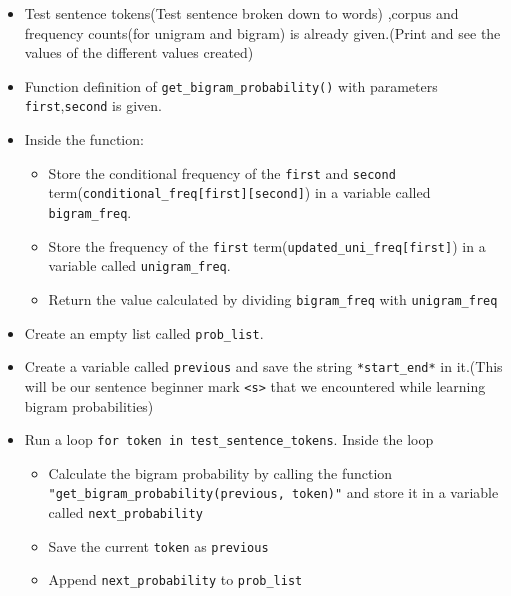 \documentclass[11pt]{article}
\providecommand{\tightlist}{%
      \setlength{\itemsep}{0pt}\setlength{\parskip}{0pt}}
\begin{document}
\begin{itemize}
\item
  Test sentence tokens(Test sentence broken down to words) ,corpus and
  frequency counts(for unigram and bigram) is already given.(Print and
  see the values of the different values created)
\item
  Function definition of \texttt{get\_bigram\_probability()} with
  parameters \texttt{first},\texttt{second} is given.
\item
  Inside the function:

  \begin{itemize}
  \item
    Store the conditional frequency of the \texttt{first} and
    \texttt{second}
    term(\texttt{conditional\_freq{[}first{]}{[}second{]}}) in a
    variable called
    \texttt{\textquotesingle{}bigram\_freq\textquotesingle{}}.
  \item
    Store the frequency of the \texttt{first}
    term(\texttt{updated\_uni\_freq{[}first{]}}) in a variable called
    \texttt{\textquotesingle{}unigram\_freq\textquotesingle{}}.
  \item
    Return the value calculated by dividing
    \texttt{\textquotesingle{}bigram\_freq\textquotesingle{}} with
    \texttt{\textquotesingle{}unigram\_freq\textquotesingle{}}
  \end{itemize}
\item
  Create an empty list called
  \texttt{\textquotesingle{}prob\_list\textquotesingle{}}.
\item
  Create a variable called
  \texttt{\textquotesingle{}previous\textquotesingle{}} and save the
  string \texttt{\textquotesingle{}*start\_end*\textquotesingle{}} in
  it.(This will be our sentence beginner mark
  \texttt{\textless{}s\textgreater{}} that we encountered while learning
  bigram probabilities)
\item
  Run a loop \texttt{for\ token\ in\ test\_sentence\_tokens}. Inside the
  loop

  \begin{itemize}
  \tightlist
  \item
    Calculate the bigram probability by calling the function
    \texttt{"get\_bigram\_probability(previous,\ token)"} and store it
    in a variable called
    \texttt{\textquotesingle{}next\_probability\textquotesingle{}}
  \item
    Save the current \texttt{\textquotesingle{}token\textquotesingle{}}
    as \texttt{\textquotesingle{}previous\textquotesingle{}}
  \item
    Append
    \texttt{\textquotesingle{}next\_probability\textquotesingle{}} to
    \texttt{\textquotesingle{}prob\_list\textquotesingle{}}
  \end{itemize}
\end{itemize}
\end{document}
